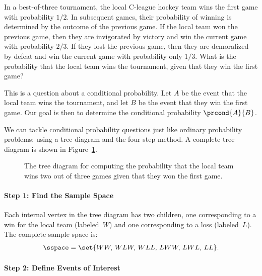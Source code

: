 In a best-of-three tournament, the local C-league hockey team wins the
first game with probability $1/2$.  In subsequent games, their
probability of winning is determined by the outcome of the previous
game.  If the local team won the previous game, then they are
invigorated by victory and win the current game with probability
$2/3$.  If they lost the previous game, then they are demoralized by
defeat and win the current game with probability only $1/3$.  What is
the probability that the local team wins the tournament, given that
they win the first game?

This is a question about a conditional probability.  Let $A$ be the
event that the local team wins the tournament, and let $B$ be the
event that they win the first game.  Our goal is then to determine the
conditional probability $\prcond{A}{B}$.

We can tackle conditional probability questions just like ordinary
probability problems: using a tree diagram and the four step method.
A complete tree diagram is shown in Figure~\ref{fig:15B2}.

\begin{figure}[h]


\caption{The tree diagram for computing the probability that the
  local team wins two out of three games given that they won
  the first game.}

\label{fig:15B2}

\end{figure}

\paragraph{Step 1:  Find the Sample Space}

Each internal vertex in the tree diagram has two children, one
corresponding to a win for the local team (labeled~$W$) and one
corresponding to a loss (labeled~$L$).  The complete sample space is:
%
\[
    \sspace = \set{ WW, \, WLW,\, WLL,\, LWW,\, LWL,\, LL }.
\]

\paragraph{Step 2:  Define Events of Interest}

